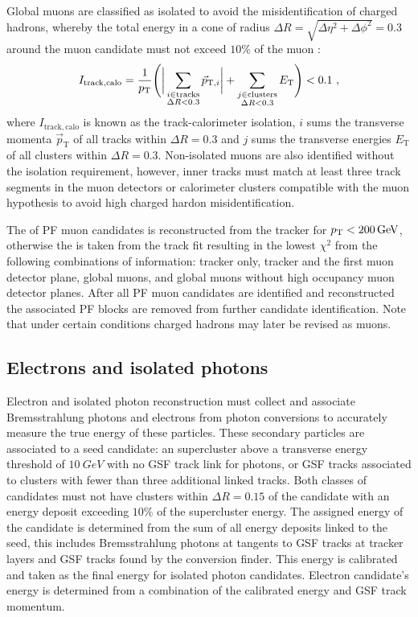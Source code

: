 Global muons are classified as isolated to avoid the misidentification of
charged hadrons, whereby the total energy in a cone of radius ${\Delta
R=\sqrt{\Delta\eta^2+\Delta\phi^2}=0.3}$ around the muon candidate must not
exceed $10\%$ of the muon \pt:
%
\begin{equation}
    I_{\mathrm{track,calo}} = \frac{1}{\pt}\Biggl(\bigg|\sum_{\substack{i\in \mathrm{tracks}\\\Delta R<0.3}} \vec{p}_{\mathrm{T},i}\bigg| + \sum_{\substack{j\in \mathrm{clusters}\\\Delta R<0.3}}E_{\mathrm{T}}\Biggr) < 0.1\ ,
\end{equation}
%
where $I_{\mathrm{track,calo}}$ is known as the track-calorimeter isolation,
$i$ sums the transverse momenta $\vec{p}_{\mathrm{T}}$ of all tracks within $\Delta R=0.3$ and $j$
sums the transverse energies $E_{\mathrm{T}}$ of all clusters within $\Delta R=0.3$.
Non-isolated muons are also identified without the isolation requirement,
however, inner tracks must match at least three track segments in the muon
detectors or calorimeter clusters compatible with the muon hypothesis to avoid
high \pt charged hardon misidentification.

The \pt of PF muon candidates is reconstructed from the tracker for
${p_{\text{T}}<\SI{200}{GeV}}$, otherwise the \pt is taken from the track fit resulting
in the lowest $\chi^2$ from the following combinations of information: tracker
only, tracker and the first muon detector plane, global muons, and global muons
without high occupancy muon detector planes. After all PF muon candidates are
identified and reconstructed the associated PF blocks are removed from further
candidate identification. Note that under certain conditions charged hadrons
may later be revised as muons.


\subsection{Electrons and isolated photons}

Electron and isolated photon reconstruction must collect and associate
Bremsstrahlung photons and electrons from photon conversions to accurately
measure the true energy of these particles. These secondary particles are
associated to a seed candidate: an \ECAL supercluster above a transverse
energy threshold of ${\SI{10}{GeV}}$ with no GSF track link for photons, or
GSF tracks associated to \ECAL clusters with fewer than three additional
linked tracks. Both classes of candidates must not have \HCAL clusters within
${\Delta R=0.15}$ of the candidate with an energy deposit exceeding $10\%$ of
the supercluster energy. The assigned energy of the candidate is determined
from the sum of all energy deposits linked to the seed, this includes
Bremsstrahlung photons at tangents to GSF tracks at tracker layers and GSF
tracks found by the conversion finder. This energy is calibrated and taken as
the final energy for isolated photon candidates. Electron candidate's energy
is determined from a combination of the calibrated \ECAL energy and GSF track
momentum.

